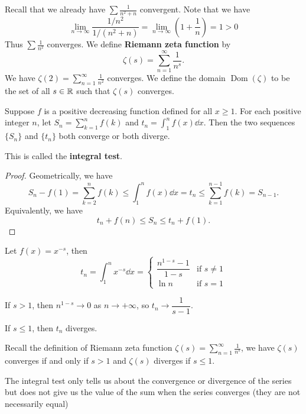 \documentclass[a4paper]{ctexart}
\begin{document}
    \begin{myex}
        Recall that we already have $\displaystyle \sum \frac{1}{n^2+n}$ convergent. Note that we have
        \[
        \lim_{n\to \infty} \frac{1/n^2}{1/(n^2+n)} = \lim_{n\to \infty} \left( 1+\frac1n \right) = 1 >0
        \]
        Thus $\displaystyle \sum \frac1{n^2}$ converges. We define \textbf{Riemann zeta function} by
        \[
        \zeta(s) = \sum_{n=1}^\infty \frac{1}{n^s}.
        \]
        We have $\zeta(2) = \displaystyle \sum_{n=1}^\infty \frac{1}{n^2}$ converges. We define the domain $\operatorname{Dom} \left( \zeta \right)$ to be the set of all $s\in \mathbb{R}$ such that $\zeta(s)$ converges.
    \end{myex}
    \begin{mythm}
        Suppose $f$ is a positive decreasing function defined for all $x\ge 1$. For each positive integer $n$, let $S_n = \displaystyle \sum_{k=1}^n f(k)$ and $\displaystyle t_n = \int_1^n f(x)\dd x$. Then the two sequences $\{S_n\}$ and $\{t_n\}$ both converge or both diverge.

        This is called the \textbf{integral test}.
    \end{mythm}
    \begin{proof}
        Geometrically, we have
        \[
        S_n - f(1) = \sum_{k=2}^n f(k) \le \int_1^n f(x)\dd x = t_n \le \sum_{k=1}^{n-1} f(k) = S_{n-1}.
        \]
        Equivalently, we have
        \[
        t_n + f(n) \le S_n \le t_n + f(1).
        \]
    \end{proof} 
    \begin{myex}
        Let $f(x) = x^{-s}$, then
        \[
        t_n = \int_1^n x^{-s} \dd x = \begin{cases}
        \dfrac{n^{1-s} - 1}{1-s} & \text{if } s\neq 1\\[6pt]
        \ln n & \text{if } s=1
        \end{cases}
        \]

        If $s>1$, then $n^{1-s} \to 0$ as $n\to +\infty$, so $t_n \to \dfrac{1}{s-1}$.

        If $s\le 1$, then $t_n$ diverges. 

        Recall the definition of Riemann zeta function $\zeta(s) = \displaystyle \sum_{n=1}^\infty \frac{1}{n^s}$, we have $\zeta(s)$ converges if and only if $s>1$ and $\zeta(s)$ diverges if $s\le 1$.
    \end{myex}
    \begin{myrmk}
        The integral test only tells us about the convergence or divergence of the series but does not give us the value of the sum when the series converges (they are not necessarily equal)
    \end{myrmk}
\end{document}
